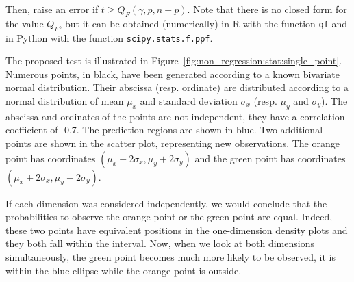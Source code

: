             Then, raise an error if \(t \geq Q_F(\gamma, p, n-p)\).  Note that there is no closed form for the value
            \(Q_F\), but it can be obtained (numerically) in R with the function
            \texttt{qf} and in Python
            with the function
            \texttt{scipy.stats.f.ppf}.

            The proposed test is illustrated in Figure~\ref{fig:non_regression:stat:single_point}. Numerous points, in
            black, have been generated according to a known bivariate normal distribution. Their abscissa (resp.
            ordinate) are distributed according to a normal distribution of mean \(\mu_x\) and standard deviation
            \(\sigma_x\) (resp. \(\mu_y\) and \(\sigma_y\)). The abscissa and ordinates of the points are not
            independent, they have a correlation coefficient of -0.7. The  prediction regions are
            shown in blue. Two additional points are shown in the scatter plot, representing new observations. The
            orange point has coordinates \((\mu_x+2\sigma_x,\mu_y+2\sigma_y)\) and the green point has coordinates
            \((\mu_x+2\sigma_x,\mu_y-2\sigma_y)\).

            If each dimension was considered independently, we would conclude that the probabilities to observe the
            orange point or the green point are equal. Indeed, these two points have equivalent positions in the
            one-dimension density plots and they both fall within the  interval. Now, when we look
            at both dimensions simultaneously, the green point becomes much more likely to be observed, it is within the
            blue ellipse while the orange point is outside.


